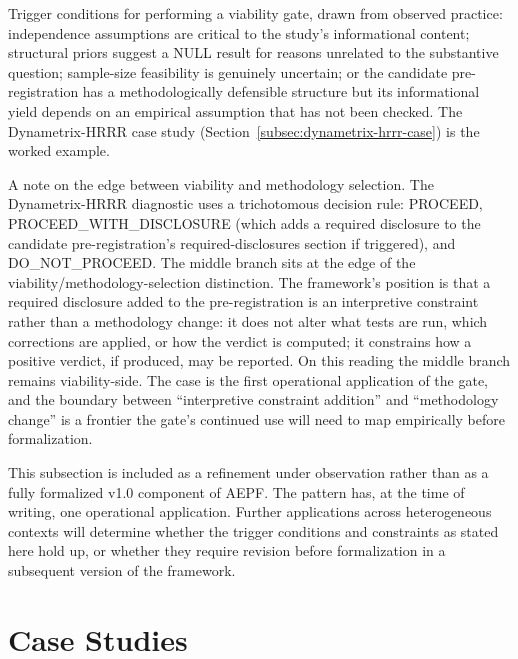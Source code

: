\documentclass[11pt]{article}
\begin{document}
Trigger conditions for performing a viability gate, drawn from
observed practice: independence assumptions are critical to the
study's informational content; structural priors suggest a NULL
result for reasons unrelated to the substantive question;
sample-size feasibility is genuinely uncertain; or the candidate
pre-registration has a methodologically defensible structure but
its informational yield depends on an empirical assumption that
has not been checked. The Dynametrix-HRRR case study
(Section~\ref{subsec:dynametrix-hrrr-case}) is the worked example.

A note on the edge between viability and methodology selection.
The Dynametrix-HRRR diagnostic uses a trichotomous decision rule:
PROCEED, PROCEED\_WITH\_DISCLOSURE (which adds a required
disclosure to the candidate pre-registration's required-disclosures
section if triggered), and DO\_NOT\_PROCEED. The middle branch
sits at the edge of the viability/methodology-selection
distinction. The framework's position is that a required disclosure
added to the pre-registration is an interpretive constraint rather
than a methodology change: it does not alter what tests are run,
which corrections are applied, or how the verdict is computed; it
constrains how a positive verdict, if produced, may be reported.
On this reading the middle branch remains viability-side. The case
is the first operational application of the gate, and the
boundary between ``interpretive constraint addition'' and
``methodology change'' is a frontier the gate's continued use will
need to map empirically before formalization.

This subsection is included as a refinement under observation
rather than as a fully formalized v1.0 component of AEPF. The
pattern has, at the time of writing, one operational application.
Further applications across heterogeneous contexts will determine
whether the trigger conditions and constraints as stated here hold
up, or whether they require revision before formalization in a
subsequent version of the framework.

\section{Case Studies}
\label{sec:case-studies}
\end{document}
